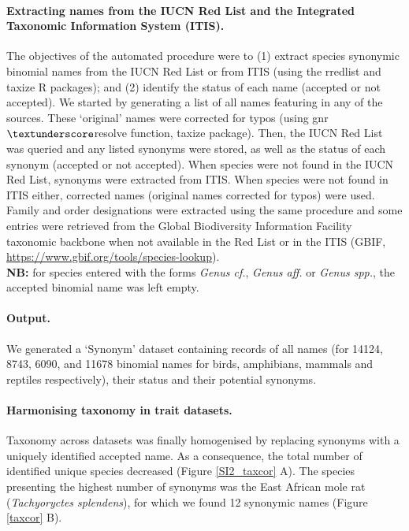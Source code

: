 \paragraph{Extracting names from the IUCN Red List and the Integrated Taxonomic Information System (ITIS).}
The objectives of the automated procedure were to (1) extract species synonymic binomial names from the IUCN Red List or from ITIS (using the rredlist \citep{rredlist} and taxize \citep{Chamberlain2013} R packages); and (2) identify the status of each name (accepted or not accepted). We started by generating a list of all names featuring in any of the sources. These `original' names were corrected for typos (using gnr$\textunderscore$resolve function, taxize package). Then, the IUCN Red List was queried and any listed synonyms were stored, as well as the status of each synonym (accepted or not accepted). When species were not found in the IUCN Red List, synonyms were extracted from ITIS. When species were not found in ITIS either, corrected names (original names corrected for typos) were used. Family and order designations were extracted using the same procedure and some entries were retrieved from the Global Biodiversity Information Facility taxonomic backbone when not available in the Red List or in the ITIS (GBIF, \url{https://www.gbif.org/tools/species-lookup}).\\
\textbf{NB:} for species entered with the forms \textit{Genus cf.}, \textit{Genus aff.} or \textit{Genus spp.}, the accepted binomial name was left empty.

\paragraph{Output.} We generated a `Synonym' dataset containing records of all names (for 14124, 8743, 6090, and 11678 binomial names for birds, amphibians, mammals and reptiles respectively), their status and their potential synonyms.

\paragraph{Harmonising taxonomy in trait datasets.}
Taxonomy across datasets was finally homogenised by replacing synonyms with a uniquely identified accepted name. As a consequence, the total number of identified unique species decreased (Figure \ref{SI2_taxcor} A). The species presenting the highest number of synonyms was the East African mole rat (\textit{Tachyoryctes splendens}), for which we found 12 synonymic names (Figure \ref{taxcor} B).

